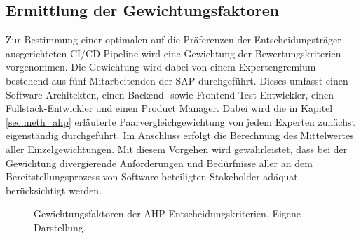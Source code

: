 \subsection{Ermittlung der Gewichtungsfaktoren}
Zur Bestimmung einer optimalen auf die Präferenzen der Entscheidungsträger ausgerichteten CI/CD-Pipeline wird eine Gewichtung der Bewertungskriterien vorgenommen. Die Gewichtung wird dabei von einem Expertengremium bestehend aus fünf Mitarbeitenden der SAP durchgeführt. Dieses umfasst einen Software-Architekten, einen Backend- sowie Frontend-Test-Entwickler, einen Fullstack-Entwickler und einen Product Manager. Dabei wird die in Kapitel \ref{sec:meth_ahp} erläuterte Paarvergleichgewichtung von jedem Experten zunächst eigenständig durchgeführt. Im Anschluss erfolgt die Berechnung des Mittelwertes aller Einzelgewichtungen. Mit diesem Vorgehen wird gewährleistet, dass bei der Gewichtung divergierende Anforderungen und Bedürfnisse aller an dem Bereitstellungsprozess von Software beteiligten Stakeholder adäquat berücksichtigt werden.   
\begin{center}
	\begin{figure}[H]
		\centering
		\caption[Gewichtungsfaktoren der AHP-Entscheidungskriterien]{Gewichtungsfaktoren der AHP-Entscheidungskriterien. Eigene Darstellung.}
		\label{fig:AHP_G}
	\end{figure}
\end{center}
\vspace*{-15mm}
